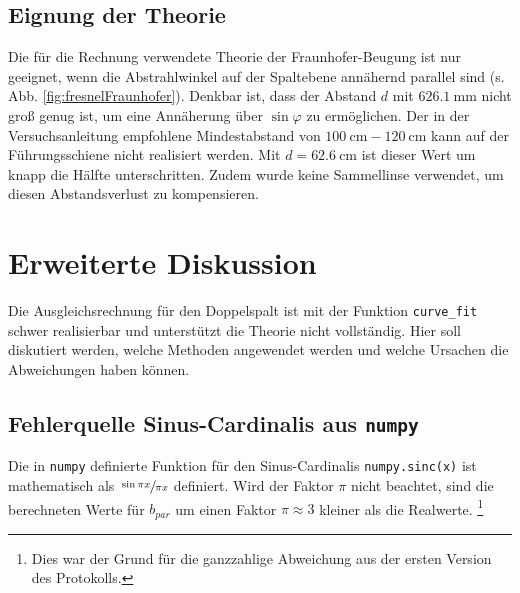 \subsection{Eignung der Theorie}
Die für die Rechnung verwendete Theorie der Fraunhofer-Beugung ist nur geeignet, wenn die Abstrahlwinkel auf der Spaltebene annähernd parallel sind (s. Abb. \ref{fig:fresnelFraunhofer}).
Denkbar ist, dass der Abstand $d$ mit $\SI{626.1}{\milli\meter}$ nicht groß genug ist, um eine Annäherung über $\sin{\varphi}$ zu ermöglichen.
Der in der Versuchsanleitung empfohlene Mindestabstand von $\SI{100}{\centi\meter} - \SI{120}{\centi\meter}$ kann auf der Führungsschiene nicht realisiert werden.
Mit $d = \SI{62.6}{\centi\meter}$ ist dieser Wert um knapp die Hälfte unterschritten. Zudem wurde keine Sammellinse verwendet, um diesen Abstandsverlust zu kompensieren.



\section{Erweiterte Diskussion}
\label{sec:Erweiterte Diskussion}
Die Ausgleichsrechnung für den Doppelspalt ist mit der Funktion \texttt{curve\_fit} schwer realisierbar und unterstützt die Theorie nicht vollständig.
Hier soll diskutiert werden, welche Methoden angewendet werden und welche Ursachen die Abweichungen haben können.

\subsection{Fehlerquelle Sinus-Cardinalis aus \texttt{numpy}}
Die in \texttt{numpy} definierte Funktion für den Sinus-Cardinalis \texttt{numpy.sinc(x)} ist mathematisch als $\sfrac{\sin{\pi x}}{\pi x}$ definiert. Wird der Faktor $\pi$ nicht beachtet, sind die berechneten
Werte für $b_{par}$ um einen Faktor $\pi \approx 3$ kleiner als die Realwerte. \footnote{Dies war der Grund für die ganzzahlige Abweichung aus der ersten Version des Protokolls.}

